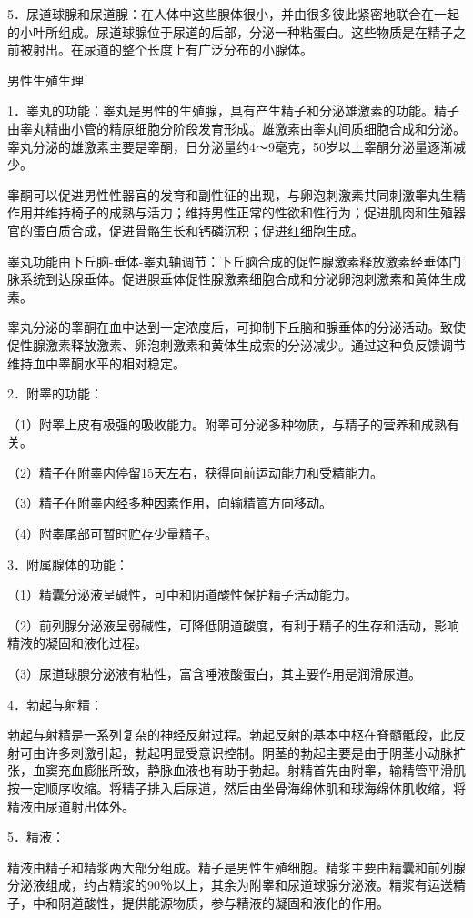 \documentclass[12pt,UTF8]{ctexbook}
\begin{document}
5．尿道球腺和尿道腺：在人体中这些腺体很小，并由很多彼此紧密地联合在一起的小叶所组成。尿道球腺位于尿道的后部，分泌一种粘蛋白。这些物质是在精子之前被射出。在尿道的整个长度上有广泛分布的小腺体。

男性生殖生理

1．睾丸的功能：睾丸是男性的生殖腺，具有产生精子和分泌雄激素的功能。精子由睾丸精曲小管的精原细胞分阶段发育形成。雄激素由睾丸间质细胞合成和分泌。睾丸分泌的雄激素主要是睾酮，日分泌量约4～9毫克，50岁以上睾酮分泌量逐渐减少。

睾酮可以促进男性性器官的发育和副性征的出现，与卵泡刺激素共同刺激睾丸生精作用并维持椅子的成熟与活力；维持男性正常的性欲和性行为；促进肌肉和生殖器官的蛋白质合成，促进骨骼生长和钙磷沉积；促进红细胞生成。

睾丸功能由下丘脑-垂体-睾丸轴调节：下丘脑合成的促性腺激素释放激素经垂体门脉系统到达腺垂体。促进腺垂体促性腺激素细胞合成和分泌卵泡刺激素和黄体生成素。

睾丸分泌的睾酮在血中达到一定浓度后，可抑制下丘脑和腺垂体的分泌活动。致使促性腺激素释放激素、卵泡刺激素和黄体生成索的分泌减少。通过这种负反馈调节维持血中睾酮水平的相对稳定。

2．附睾的功能：

（1）附睾上皮有极强的吸收能力。附睾可分泌多种物质，与精子的营养和成熟有关。

（2）精子在附睾内停留15天左右，获得向前运动能力和受精能力。

（3）精子在附睾内经多种因素作用，向输精管方向移动。

（4）附睾尾部可暂时贮存少量精子。

3．附属腺体的功能：

（1）精囊分泌液呈碱性，可中和阴道酸性保护精子活动能力。

（2）前列腺分泌液呈弱碱性，可降低阴道酸度，有利于精子的生存和活动，影响精液的凝固和液化过程。

（3）尿道球腺分泌液有粘性，富含唾液酸蛋白，其主要作用是润滑尿道。

4．勃起与射精：

勃起与射精是一系列复杂的神经反射过程。勃起反射的基本中枢在脊髓骶段，此反射可由许多刺激引起，勃起明显受意识控制。阴茎的勃起主要是由于阴茎小动脉扩张，血窦充血膨胀所致，静脉血液也有助于勃起。射精首先由附睾，输精管平滑肌按一定顺序收缩。将精子排入后尿道，然后由坐骨海绵体肌和球海绵体肌收缩，将精液由尿道射出体外。

5．精液：

精液由精子和精浆两大部分组成。精子是男性生殖细胞。精浆主要由精囊和前列腺分泌液组成，约占精浆的90％以上，其余为附睾和尿道球腺分泌液。精浆有运送精子，中和阴道酸性，提供能源物质，参与精液的凝固和液化的作用。
\end{document}
